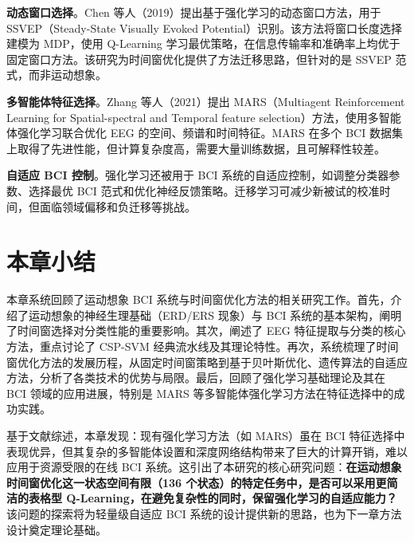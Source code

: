 \textbf{动态窗口选择}。Chen 等人（2019）提出基于强化学习的动态窗口方法，用于 SSVEP（Steady-State Visually Evoked Potential）识别\cite{chen2019dynamic}。该方法将窗口长度选择建模为 MDP，使用 Q-Learning 学习最优策略，在信息传输率和准确率上均优于固定窗口方法。该研究为时间窗优化提供了方法迁移思路，但针对的是 SSVEP 范式，而非运动想象。

\textbf{多智能体特征选择}。Zhang 等人（2021）提出 MARS（Multiagent Reinforcement Learning for Spatial-spectral and Temporal feature selection）方法，使用多智能体强化学习联合优化 EEG 的空间、频谱和时间特征\cite{zhang2021mars}。MARS 在多个 BCI 数据集上取得了先进性能，但计算复杂度高，需要大量训练数据，且可解释性较差。

\textbf{自适应 BCI 控制}。强化学习还被用于 BCI 系统的自适应控制，如调整分类器参数、选择最优 BCI 范式和优化神经反馈策略\cite{jayaram2016transfer}。迁移学习可减少新被试的校准时间，但面临领域偏移和负迁移等挑战。

\section{本章小结}
本章系统回顾了运动想象 BCI 系统与时间窗优化方法的相关研究工作。首先，介绍了运动想象的神经生理基础（ERD/ERS 现象）与 BCI 系统的基本架构，阐明了时间窗选择对分类性能的重要影响。其次，阐述了 EEG 特征提取与分类的核心方法，重点讨论了 CSP-SVM 经典流水线及其理论特性。再次，系统梳理了时间窗优化方法的发展历程，从固定时间窗策略到基于贝叶斯优化、遗传算法的自适应方法，分析了各类技术的优势与局限。最后，回顾了强化学习基础理论及其在 BCI 领域的应用进展，特别是 MARS 等多智能体强化学习方法在特征选择中的成功实践。

基于文献综述，本章发现：现有强化学习方法（如 MARS）虽在 BCI 特征选择中表现优异，但其复杂的多智能体设置和深度网络结构带来了巨大的计算开销，难以应用于资源受限的在线 BCI 系统。这引出了本研究的核心研究问题：\textbf{在运动想象时间窗优化这一状态空间有限（136 个状态）的特定任务中，是否可以采用更简洁的表格型 Q-Learning，在避免复杂性的同时，保留强化学习的自适应能力？} 该问题的探索将为轻量级自适应 BCI 系统的设计提供新的思路，也为下一章方法设计奠定理论基础。



